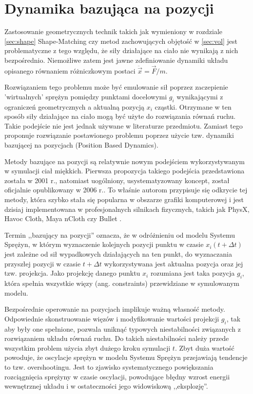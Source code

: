\section{Dynamika bazująca na pozycji}
\label{sec:dyn}

Zastosowanie geometrycznych technik takich jak wymieniony w rozdziale
\ref{sec:shape} Shape-Matching czy metod zachowujących objętość w \ref{sec:vol}
jest problematyczne z tego względu, że siły działające na ciało nie wynikają
z nich bezpośrednio. Niemożliwe zatem jest jawne zdefiniowanie dynamiki układu
opisanego równaniem różniczkowym postaci $\ddot{\vec{x}} = \vec{F}/m$.

Rozwiązaniem tego problemu może być emulowanie sił poprzez zaczepienie
'wirtualnych' sprężyn pomiędzy punktami docelowymi $g_i$ wynikającymi z ograniczeń
geometrycznych a aktualną pozycją $x_i$ cząstki. Otrzymane w ten sposób
siły działające na ciało mogą być użyte do rozwiązania równań ruchu.
Takie podejście nie jest jednak używane w literaturze przedmiotu. Zamiast tego
\cite{pbdyn} proponuje rozwiązanie postawionego problemu poprzez użycie
tzw. dynamiki bazującej na pozycjach (Position Based Dynamics).

Metody bazujące na pozycji są relatywnie nowym podejściem wykorzystywanym w symulacji
ciał miękkich. Pierwsza propozycja takiego podejścia przedstawiona została w
2001 r.\cite{jak}, natomiast uogólniony, usystematyzowany koncept, został oficjalnie
opublikowany w 2006 r.\cite{pbdyn}. To właśnie autorom \cite{pbdyn} przypisuje
się odkrycie tej metody, która szybko stała się popularna w obszarze grafiki
komputerowej i jest dzisiaj implementowana w profesjonalnych silnikach fizycznych,
takich jak PhysX, Havoc Cloth, Maya nCloth czy Bullet \cite{Liu:2013:FSM}.

Termin ,,bazujący na pozycji'' oznacza, że w odróżnieniu od modelu Systemu Sprężyn,
	   w którym wyznaczenie kolejnych pozycji punktu w czasie $x_i(t +
			   \Delta t)$ jest zależne od sił wypadkowych działających na ten
	   punkt, do wyznaczania przyszłej pozycji w czasie $t + \Delta t$
	   wykorzystywana jest aktualna pozycja oraz jej tzw. projekcja. Jako
	   projekcję danego punktu $x_i$ rozumiana jest taka pozycja $g_i$, która
	   spełnia wszystkie więzy (ang. constraints)
	przewidziane w symulowanym modelu.

Bezpośrednie operowanie na pozycjach implikuje ważną własność metody. Odpowiednie
skonstruowanie więzów i modyfikowanie wartości projekcji $g_i$, tak
aby były one spełnione, pozwala uniknąć typowych niestabilności związanych z
rozwiązaniem układu równań ruchu. Do takich niestabilności należy przede
wszystkim problem użycia zbyt dużego kroku symulacji $t$. Zbyt
duża wartość powoduje, że oscylacje sprężyn w modelu Systemu Sprężyn przejawiają
tendencje to tzw. overshootingu. Jest to zjawisko systematycznego powiększania rozciągnięcia
sprężyny w czasie oscylacji, powodujące błędny wzrost energii wewnętrznej układu i w
ostateczności jego widowiskową ,,eksplozję''.

